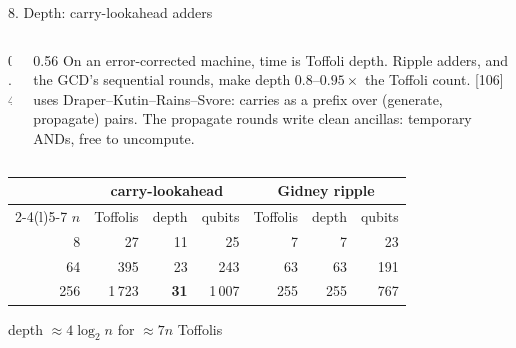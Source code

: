 \documentclass[aspectratio=169,11pt]{beamer}
\begin{document}
\begin{frame}{8. Depth: carry-lookahead adders}
  \begin{columns}[c]
    \begin{column}{0.4\textwidth}
      \centering
    \end{column}
    \begin{column}{0.56\textwidth}
      \small On an error-corrected machine, time is Toffoli depth. Ripple adders, and the GCD's sequential rounds, make depth $0.8$--$0.95\times$ the Toffoli count.
      \vskip2mm
      [106] uses Draper--Kutin--Rains--Svore: carries as a prefix over (generate, propagate) pairs. The propagate rounds write clean ancillas: temporary ANDs, free to uncompute.
    \end{column}
  \end{columns}
  \vskip2mm
  \centering\footnotesize
  \renewcommand{\arraystretch}{1.05}
  \begin{tabular}{@{}rrrrrrr@{}}
    \toprule
    & \multicolumn{3}{c}{carry-lookahead} & \multicolumn{3}{c}{Gidney ripple} \\
    \cmidrule(lr){2-4}\cmidrule(l){5-7}
    $n$ & Toffolis & depth & qubits & Toffolis & depth & qubits \\
    \midrule
    8 & 27 & 11 & 25 & 7 & 7 & 23 \\
    64 & 395 & 23 & 243 & 63 & 63 & 191 \\
    256 & 1\,723 & \textbf{31} & 1\,007 & 255 & 255 & 767 \\
    \bottomrule
  \end{tabular}\par
  {\scriptsize depth $\approx4\log_2n$ for $\approx7n$ Toffolis}
\end{frame}
\end{document}
